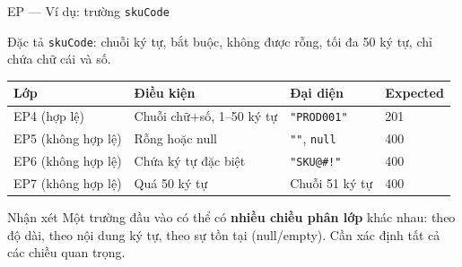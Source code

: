 \documentclass[aspectratio=169,12pt]{beamer}
\begin{document}
\begin{frame}{EP --- Ví dụ: trường \texttt{skuCode}}
  \begin{block}{Đặc tả}
    \texttt{skuCode}: chuỗi ký tự, bắt buộc, không được rỗng,
    tối đa 50 ký tự, chỉ chứa chữ cái và số.
  \end{block}

  \vspace{0.3em}
  \begin{center}
  \small
  \begin{tabular}{p{2cm}p{3.5cm}p{2.5cm}p{2.5cm}}
    \toprule
    \textbf{Lớp} & \textbf{Điều kiện} & \textbf{Đại diện} & \textbf{Expected} \\
    \midrule
    EP4 (hợp lệ)   & Chuỗi chữ+số, 1--50 ký tự & \texttt{"PROD001"} & 201 \\
    EP5 (không hợp lệ) & Rỗng hoặc null & \texttt{""}, \texttt{null} & 400 \\
    EP6 (không hợp lệ) & Chứa ký tự đặc biệt & \texttt{"SKU@\#!"} & 400 \\
    EP7 (không hợp lệ) & Quá 50 ký tự & Chuỗi 51 ký tự & 400 \\
    \bottomrule
  \end{tabular}
  \end{center}

  \vspace{0.3em}
  \begin{exampleblock}{Nhận xét}
    Một trường đầu vào có thể có \textbf{nhiều chiều phân lớp} khác nhau:
    theo độ dài, theo nội dung ký tự, theo sự tồn tại (null/empty).
    Cần xác định tất cả các chiều quan trọng.
  \end{exampleblock}
\end{frame}
\end{document}
